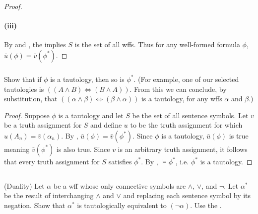 \documentclass{report}
\begin{document}
\begin{proof}
    \paragraph{(iii)}%

      By  and ,
        the  implies $S$ is the set of all
        wffs.
      Thus for any well-formed formula $\phi$,
        $\bar{u}(\phi) = \bar{v}(\phi^*)$.

  \end{proof}

\subsubsection{}%

  Show that if $\phi$ is a tautology, then so is $\phi^*$.
  (For example, one of our selected tautologies is
    $((A \land B) \Leftrightarrow (B \land A))$. From this we can conclude, by
    substitution, that
    $((\alpha \land \beta) \Leftrightarrow (\beta \land \alpha))$ is a
    tautology, for any wffs $\alpha$ and $\beta$.)

  \begin{proof}
    Suppose $\phi$ is a tautology and let $S$ be the set of all sentence
      symbols.
    Let $v$ be a truth assignment for $S$ and define $u$ to be the truth
      assignment for which $u(A_n) = \bar{v}(\alpha_n)$.
    By , $\bar{u}(\phi) = \bar{v}(\phi^*)$.
    Since $\phi$ is a tautology, $\bar{u}(\phi)$ is true meaning
      $\bar{v}(\phi^*)$ is also true.
    Since $v$ is an arbitrary truth assignment, it follows that every truth
      assignment for $S$ satisfies $\phi^*$.
    By , $\vDash \phi^*$, i.e. $\phi^*$ is a
      tautology.
  \end{proof}

\subsection{}%

  (Duality) Let $\alpha$ be a wff whose only connective symbols are $\land$,
    $\lor$, and $\neg$.
  Let $\alpha^*$ be the result of interchanging $\land$ and $\lor$ and replacing
    each sentence symbol by its negation.
  Show that $\alpha^*$ is tautologically equivalent to $(\neg\alpha)$.
  Use the .
\end{document}

